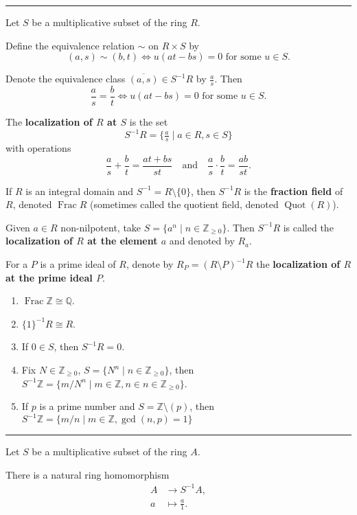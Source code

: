 \documentclass[12pt]{article}
\newcommand{\keyword}[1]{\textbf{#1}}
\newcommand{\sepline}{\rule{\textwidth}{0.4pt}}
\theoremstyle{definition}
\newcommand{\isp}[1]{\quad\text{#1}\quad}
\newcommand{\Z}{\mathbb{Z}}
\newcommand{\Zpos}{\mathbb{Z}_{\geq0}}
\newcommand{\Q}{\mathbb{Q}}
\newcommand{\<}{\left\langle}
\renewcommand{\>}{\right\rangle}
\newcommand{\isom}{\cong}
\newcommand{\eqc}{\overline}
\begin{document}
\sepline

Let $S$ be a multiplicative subset of the ring $R$.

Define the equivalence relation $\sim$ on $R \times S$ by
\[
    (a, s) \sim (b, t) \iff u(at - bs) = 0 \text{ for some } u \in S.
\]

Denote the equivalence class $\eqc{(a, s)} \in S^{-1}R$ by $\frac{a}{s}$. Then
\[
    \frac{a}{s} = \frac{b}{t} \iff u(at - bs) = 0 \text{ for some } u \in S.
\]

The \keyword{localization of $R$ at $S$} is the set
\[
    S^{-1}R = \{\tfrac{a}{s} \mid a \in R, s \in S\}
\]
with operations
\[
    \frac{a}{s} + \frac{b}{t} = \frac{at + bs}{st}
    \isp{and}
    \frac{a}{s} \cdot \frac{b}{t} = \frac{ab}{st}.
\]

If $R$ is an integral domain and $S^{-1} = R \setminus \{0\}$, then $S^{-1}R$ is the \keyword{fraction field} of $R$, denoted $\operatorname{Frac} R$ (sometimes called the quotient field, denoted $\operatorname{Quot}(R)$).

Given $a \in R$ non-nilpotent, take $S = \{a^n \mid n \in \Zpos\}$. Then $S^{-1}R$ is called the \keyword{localization of $R$ at the element $a$} and denoted by $R_a$.

For a $P$ is a prime ideal of $R$, denote by $R_P = (R \setminus P)^{-1}R$ the \keyword{localization of $R$ at the prime ideal $P$}.

\begin{enumerate}
    \item $\operatorname{Frac} \Z \isom \Q$.
    
    \item $\{1\}^{-1}R \isom R$.
    
    \item If $0 \in S$, then $S^{-1}R = 0$.
    
    \item Fix $N \in \Zpos$, $S = \{N^n \mid n \in \Zpos\}$, then $S^{-1}\Z = \{m/N^n \mid m \in \Z, n \in n \in \Zpos\}$.
    
    \item If $p$ is a prime number and $S = \Z \setminus (p)$, then $S^{-1}\Z = \{m/n \mid m \in \Z, \gcd(n, p) = 1\}$
\end{enumerate}


\sepline

Let $S$ be a multiplicative subset of the ring $A$.

There is a natural ring homomorphism
\begin{align*}
    A &\to S^{-1}A, \\
    a &\mapsto \frac{a}{1}.
\end{align*}
\end{document}
